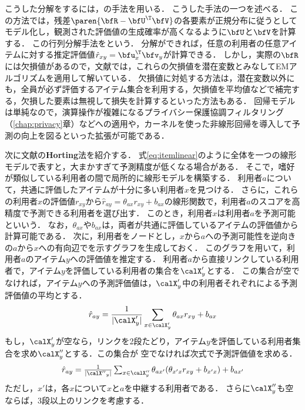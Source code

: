 こうした分解をするには，の手法を用いる．
こうした手法の一つ\cite{sigir:02:01}を述べる．
この方法では，残差$\paren{\bfR-\bfU^\T\bfV}$の各要素が正規分布に従うとしてモデル化し，観測された評価値の生成確率が高くなるように$\bfU$と$\bfV$を計算する．
この行列分解手法をという．
分解ができれば，任意の利用者の任意アイテムに対する推定評価値$\hat{r}_{xy}=\bfu_x^\T \bfv_y$が計算できる．
しかし，実際の$\bfR$には欠損値があるので，文献\cite{sigir:02:01}では，これらの欠損値を潜在変数とみなしてEMアルゴリズム\cite{jrss:77:01}を適用して解いている．
欠損値に対処する方法は，潜在変数以外にも，全員が必ず評価するアイテム集合を利用する，欠損値を平均値などで補完する，欠損した要素は無視して損失を計算する\cite{kdd:07:01}といった方法もある．
回帰モデルは単純なので，演算操作が複雑になるプライバシー保護協調フィルタリング（\ref{chap:privacy}章）などへの適用や，カーネルを使った非線形回帰を導入して予測の向上を図るといった拡張が可能である．

次に文献\cite{kdd:99:04}の\textbf{Horting}法を紹介する．
式\eqref{eq:itemlinear}のように全体を一つの線形モデルで表すと，大まかすぎて予測精度が低くなる場合がある．
そこで，嗜好が類似している利用者の間で局所的に線形モデルを構築する．
利用者$a$について，共通に評価したアイテムが十分に多い利用者$x$を見つける．
さらに，これらの利用者$x$の評価値$r_{xy}$から$\hat{r}_{ay}=\theta_{ax}r_{xy} + b_{ax}$の線形関数で，利用者$a$のスコアを高精度で予測できる利用者を選び出す．
このとき，利用者$x$は利用者$a$を予測可能といいう．
なお，$\theta_{ax}$や$b_{ax}$は，両者が共通に評価しているアイテムの評価値から計算可能である．
次に，利用者をノードとし，$x$から$a$への予測可能性を逆向きの$a$から$x$への有向辺でを示すグラフを生成しておく．
このグラフを用いて，利用者$a$のアイテム$y$への評価値を推定する．
利用者$a$から直接リンクしている利用者で，アイテム$y$を評価している利用者の集合を$\calX'_y$とする．
この集合が空でなければ，アイテム$y$への予測評価値は，$\calX'_y$中の利用者それぞれによる予測評価値の平均とする．
\[
 \hat{r}_{ay}=\frac{1}{|\calX'_y|}
\sum_{x\in\calX'_y}\theta_{ax}r_{xy} + b_{ax}
\]
もし，$\calX'_y$が空なら，リンクを2段たどり，アイテム$y$を評価している利用者集合を求め$\calX''_y$とする．この集合が
空でなければ次式で予測評価値を求める．
\[
\textstyle
 \hat{r}_{ay}=\frac{1}{|{\calX''}_y|}\sum_{x\in\calX''_y}\theta_{ax'}(\theta_{x'x}r_{xy} + b_{x'x}) + b_{ax'} 
\]
ただし，$x'$は，各$x$について$x$と$a$を中継する利用者である．
さらに$\calX''_y$も空ならば，3段以上のリンクを考慮する．

